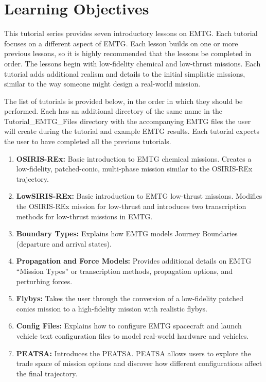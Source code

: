 \documentclass[11pt]{article}
\begin{document}
\section{Learning Objectives}
\label{sec:learning_objectives}

This tutorial series provides seven introductory lessons on \ac{EMTG}. Each tutorial focuses on a different aspect of \ac{EMTG}. Each lesson builds on one or more previous lessons, so it is highly recommended that the lessons be completed in order. The lessons begin with low-fidelity chemical and low-thrust missions. Each tutorial adds additional realism and details to the initial simplistic missions, similar to the way someone might design a real-world mission.

\noindent The list of tutorials is provided below, in the order in which they should be performed. Each has an additional directory of the same name in the Tutorial\_EMTG\_Files directory with the accompanying \ac{EMTG} files the user will create during the tutorial and example \ac{EMTG} results. Each tutorial expects the user to have completed all the previous tutorials.

\begin{enumerate}
	\item \textbf{OSIRIS-REx:} Basic introduction to \ac{EMTG} chemical missions. Creates a low-fidelity, patched-conic, multi-phase mission similar to the OSIRIS-REx trajectory.
	\item \textbf{LowSIRIS-REx:} Basic introduction to \ac{EMTG} low-thrust missions. Modifies the OSIRIS-REx mission for low-thrust and introduces two transcription methods for low-thrust missions in \ac{EMTG}.
	\item \textbf{Boundary Types:} Explains how \ac{EMTG} models Journey Boundaries (departure and arrival states).
	\item \textbf{Propagation and Force Models:} Provides additional details on \ac{EMTG} “Mission Types” or transcription methods, propagation options, and perturbing forces.
	\item \textbf{Flybys:} Takes the user through the conversion of a low-fidelity patched conics mission to a high-fidelity mission with realistic flybys.
	\item \textbf{Config Files:} Explains how to configure \ac{EMTG} spacecraft and launch vehicle text configuration files to model real-world hardware and vehicles.
	\item \textbf{PEATSA:} Introduces the \ac{PEATSA}. \ac{PEATSA} allows users to explore the trade space of mission options and discover how different configurations affect the final trajectory.
\end{enumerate}
\end{document}
